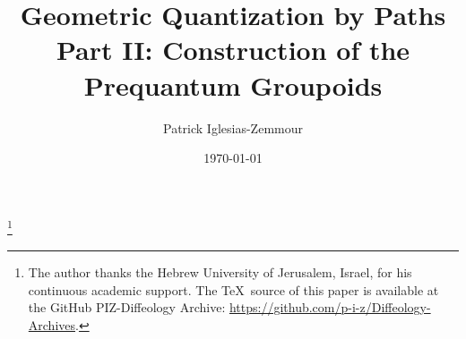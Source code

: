 \documentclass[11pt,reqno,letterpaper,twoside]{amsart}
\begin{document}
  
  
  \title[Geometric Quantization by Paths II]{Geometric Quantization by Paths \\ {\scriptsize Part II: Construction of the Prequantum Groupoids}}
  
  \author{Patrick Iglesias-Zemmour}
  
  \address{Einstein Institute of Mathematics,
  The Hebrew University of Jerusalem,
  Campus Givat Ram,
  9190401 Israel.}
  
  \thanks{The author thanks the Hebrew University of Jerusalem, Israel, for his continuous academic support. The \TeX\ source of this paper is available at the GitHub PIZ-Diffeology Archive: \url{https://github.com/p-i-z/Diffeology-Archives}.}
  
  \date{\today}
  
  
  
\end{document}
